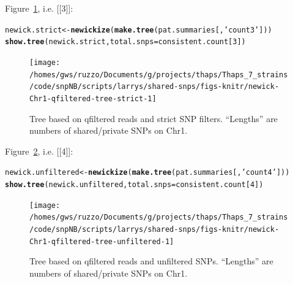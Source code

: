\documentclass{article}\usepackage[]{graphicx}\usepackage[]{color}
\makeatletter
\newcommand{\hlnum}[1]{\textcolor[rgb]{0.686,0.059,0.569}{#1}}%
\newcommand{\hlstr}[1]{\textcolor[rgb]{0.192,0.494,0.8}{#1}}%
\newcommand{\hlstd}[1]{\textcolor[rgb]{0.345,0.345,0.345}{#1}}%
\newcommand{\hlkwb}[1]{\textcolor[rgb]{0.69,0.353,0.396}{#1}}%
\newcommand{\hlkwc}[1]{\textcolor[rgb]{0.333,0.667,0.333}{#1}}%
\newcommand{\hlkwd}[1]{\textcolor[rgb]{0.737,0.353,0.396}{\textbf{#1}}}%
\newenvironment{kframe}{%
 \def\at@end@of@kframe{}%
 \ifinner\ifhmode%
  \def\at@end@of@kframe{\end{minipage}}%
  \begin{minipage}{\columnwidth}%
 \fi\fi%
 \def\FrameCommand##1{\hskip\@totalleftmargin \hskip-\fboxsep
 \colorbox{shadecolor}{##1}\hskip-\fboxsep
     \hskip-\linewidth \hskip-\@totalleftmargin \hskip\columnwidth}%
 \MakeFramed {\advance\hsize-\width
   \@totalleftmargin\z@ \linewidth\hsize
   \@setminipage}}%
 {\par\unskip\endMakeFramed%
 \at@end@of@kframe}
\newenvironment{knitrout}{}{} %
\makeatother
\begin{document}
Figure~\ref{fig:tree-strict}, i.e. [[3]]:

\begin{knitrout}\scriptsize
{}\color{fgcolor}\begin{kframe}
\begin{alltt}
\hlstd{newick.strict} \hlkwb{<-} \hlkwd{newickize}\hlstd{(}\hlkwd{make.tree}\hlstd{(pat.summaries[,}\hlstr{'count3'}\hlstd{]))}
\hlkwd{show.tree}\hlstd{(newick.strict,} \hlkwc{total.snps}\hlstd{=consistent.count[}\hlnum{3}\hlstd{])}
\end{alltt}
\end{kframe}\begin{figure}

{\centering \texttt{[image: /homes/gws/ruzzo/Documents/g/projects/thaps/Thaps\_7\_strains/code/snpNB/scripts/larrys/shared-snps/figs-knitr/newick-Chr1-qfiltered-tree-strict-1]} 

}

\caption[Tree based on qfiltered reads and strict SNP filters]{Tree based on qfiltered reads and strict SNP filters.  ``Lengths'' are numbers of shared/private SNPs on Chr1.}\label{fig:tree-strict}
\end{figure}


\end{knitrout}

Figure~\ref{fig:tree-unfiltered}, i.e. [[4]]:

\begin{knitrout}\scriptsize
{}\color{fgcolor}\begin{kframe}
\begin{alltt}
\hlstd{newick.unfiltered} \hlkwb{<-} \hlkwd{newickize}\hlstd{(}\hlkwd{make.tree}\hlstd{(pat.summaries[,}\hlstr{'count4'}\hlstd{]))}
\hlkwd{show.tree}\hlstd{(newick.unfiltered,} \hlkwc{total.snps}\hlstd{=consistent.count[}\hlnum{4}\hlstd{])}
\end{alltt}
\end{kframe}\begin{figure}

{\centering \texttt{[image: /homes/gws/ruzzo/Documents/g/projects/thaps/Thaps\_7\_strains/code/snpNB/scripts/larrys/shared-snps/figs-knitr/newick-Chr1-qfiltered-tree-unfiltered-1]} 

}

\caption[Tree based on qfiltered reads and unfiltered SNPs]{Tree based on qfiltered reads and unfiltered SNPs.  ``Lengths'' are numbers of shared/private SNPs on Chr1.}\label{fig:tree-unfiltered}
\end{figure}


\end{knitrout}
\end{document}
